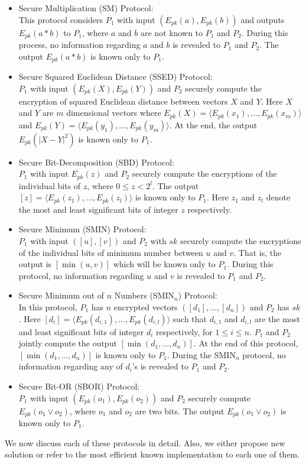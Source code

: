 \documentclass{article}
\begin{document}
\begin{itemize}
\item Secure Multiplication (SM) Protocol:\\ 
This protocol considers $P_1$ 
with input $(E_{pk}(a), E_{pk}(b))$ and outputs $E_{pk}(a\ast b)$ to $P_1$, where $a$ and 
$b$ are not known to $P_1$ and $P_2$. 
During this process, no information regarding $a$ and $b$ is revealed to $P_1$ and $P_2$. The output $E_{pk}(a\ast b)$ is known only to $P_1$.
\item Secure Squared Euclidean Distance (SSED) Protocol:\\ 
$P_1$ with input $(E_{pk}(X), E_{pk}(Y))$ 
and $P_2$ securely compute the encryption of squared Euclidean distance between vectors $X$ and $Y$. 
Here $X$ and $Y$ are $m$ dimensional vectors where $E_{pk}(X) = \langle E_{pk}(x_1), \ldots, E_{pk}(x_m)\rangle $ and 
$E_{pk}(Y) = \langle E_{pk}(y_1), \ldots, E_{pk}(y_m)\rangle$. At the end, the output  
$E_{pk}(|X - Y|^2)$ is known only to $P_1$.
\item Secure Bit-Decomposition (SBD) Protocol:\\ 
$P_1$ with input $E_{pk}(z)$ and $P_2$ securely compute the 
encryptions of the individual bits of $z$, where $0 \le z < 2^l$. The 
output $[z] = \langle E_{pk}(z_1), \ldots, E_{pk}(z_l)\rangle $ is known only to $P_1$. Here $z_1$ and $z_l$ 
denote the most and least significant bits of integer $z$ respectively.
\item Secure Minimum (SMIN) Protocol:\\ 
$P_1$ with input $([u], [v])$ and $P_2$ with $sk$ securely compute 
the encryptions of the individual bits of minimum number between $u$ and $v$. 
That is, the output is $[\min(u, v)]$ which will be known only to $P_1$. During this protocol, 
no information regarding $u$ and $v$ is revealed to $P_1$ and $P_2$.
\item Secure Minimum out of $n$ Numbers (SMIN$_n$) Protocol:\\ 
In this protocol, $P_1$ has $n$ encrypted vectors $([d_1], \ldots, [d_n])$ and 
$P_2$ has $sk$. Here $[d_i] = \langle E_{pk}(d_{i,1}), \ldots, E_{pk}(d_{i,l}) \rangle$ such that 
$d_{i,1}$ and $d_{i,l}$ are the most and least significant bits of integer $d_{i}$ respectively, 
for $1 \le i \le n$. $P_1$ and $P_2$ jointly compute the output $[\min(d_1,\ldots, d_n)]$. 
At the end of this protocol, $[\min(d_1,\ldots, d_n)]$ is known only to $P_1$. During the SMIN$_n$ 
protocol, no information regarding any of $d_i$'s is revealed to $P_1$ and $P_2$.
\item Secure Bit-OR (SBOR) Protocol:\\
$P_1$ with input $(E_{pk}(o_1), E_{pk}(o_2))$ and $P_2$ securely compute 
$E_{pk}(o_1\vee o_2)$, where $o_1$ and $o_2$ are two bits. The output $E_{pk}(o_1\vee o_2)$ is 
known only to $P_1$. 
\end{itemize}
We now discuss each of these protocols in detail. 
Also, we either propose new solution or refer to the most efficient 
known implementation to each one of them. \\
\end{document}
